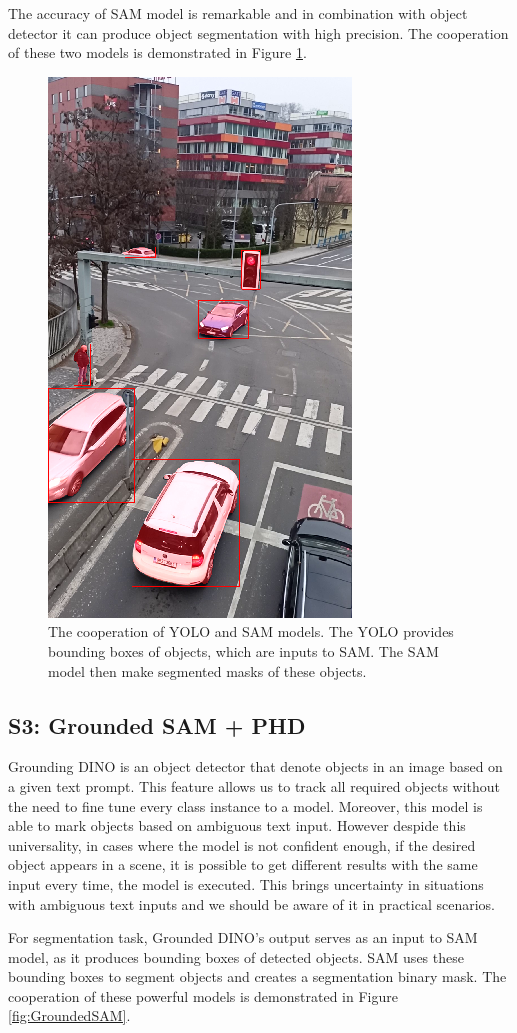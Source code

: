 The accuracy of SAM model is remarkable and in combination with object detector it can produce object segmentation
with high precision. The cooperation of these two models is demonstrated in Figure \ref{fig:yolo_sam_seg}.
\begin{figure}[h!t]
  \centering
  \includegraphics[width=0.35\linewidth]{text/chapter_04/imgs/YOLO_SAM_02}
  \caption{The cooperation of YOLO and SAM models. The YOLO provides bounding boxes of objects, which are inputs to
  SAM. The SAM model then make segmented masks of these objects.}
  \label{fig:yolo_sam_seg}
\end{figure}

\subsection{S3: Grounded SAM + PHD}
Grounding DINO is an object detector that denote objects in an image based on a given text prompt. This feature
allows us to track all required objects without the need to fine tune every class instance to a model. Moreover, this
model is able to mark objects based on ambiguous text input. However despide this universality, in cases where the
model is not confident enough, if the desired object appears in a scene, it is possible to get different results with
the same input every time, the model is executed. This brings uncertainty in situations with ambiguous text inputs
and we should be aware of it in practical scenarios.

For segmentation task, Grounded DINO's output serves as an input to SAM model, as it produces bounding boxes of detected objects.
SAM uses these bounding boxes to segment objects and creates a segmentation binary mask. The cooperation of these
powerful models is demonstrated in Figure \ref{fig:GroundedSAM}.

